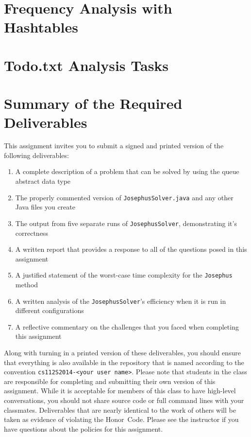 \section*{Frequency Analysis with Hashtables}

\section*{Todo.txt Analysis Tasks}

\section*{Summary of the Required Deliverables}

  This assignment invites you to submit a signed and printed version of the following deliverables: 

  \begin{enumerate} 
  \itemsep0pt

  \item A complete description of a problem that can be solved by using the queue abstract data type

  \item The properly commented version of {\tt JosephusSolver.java} and any other Java files you create

  \item The output from five separate runs of {\tt JosephusSolver}, demonstrating it's correctness 

  \item A written report that provides a response to all of the questions posed in this assignment

  \item A justified statement of the worst-case time complexity for the {\tt Josephus} method

  \item A written analysis of the {\tt JosephusSolver}'s efficiency when it is run in different configurations 

  \item A reflective commentary on the challenges that you faced when completing this assignment 
   
  \end{enumerate}

  Along with turning in a printed version of these deliverables, you should ensure that everything is also available in
  the repository that is named according to the convention {\tt cs112S2014-<your user name>}. Please note that students
  in the class are responsible for completing and submitting their own version of this assignment.    While it is
  acceptable for members of this class to have high-level conversations, you should not share source code or full
  command lines with your classmates.  Deliverables that are nearly identical to the work of others will be taken as
  evidence of violating the \mbox{Honor Code}.  Please see the instructor if you have questions about the policies for
  this assignment.

  
